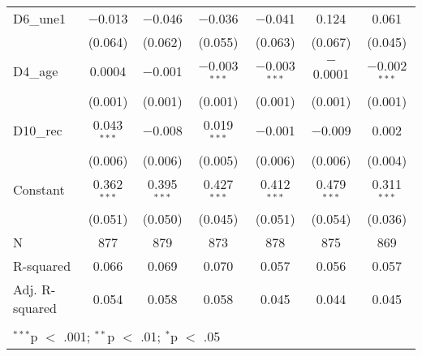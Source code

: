 \documentclass[
]{article}
\begin{document}
\begin{table}[!htbp]
\begin{tabular}{@{\extracolsep{5pt}}lcccccc}
  D6\_une1 & $-$0.013 & $-$0.046 & $-$0.036 & $-$0.041 & 0.124 & 0.061 \\ 
  & (0.064) & (0.062) & (0.055) & (0.063) & (0.067) & (0.045) \\ 
  D4\_age & 0.0004 & $-$0.001 & $-$0.003$^{***}$ & $-$0.003$^{***}$ & $-$0.0001 & $-$0.002$^{***}$ \\ 
  & (0.001) & (0.001) & (0.001) & (0.001) & (0.001) & (0.001) \\ 
  D10\_rec & 0.043$^{***}$ & $-$0.008 & 0.019$^{***}$ & $-$0.001 & $-$0.009 & 0.002 \\ 
  & (0.006) & (0.006) & (0.005) & (0.006) & (0.006) & (0.004) \\ 
  Constant & 0.362$^{***}$ & 0.395$^{***}$ & 0.427$^{***}$ & 0.412$^{***}$ & 0.479$^{***}$ & 0.311$^{***}$ \\ 
  & (0.051) & (0.050) & (0.045) & (0.051) & (0.054) & (0.036) \\ 
 N & 877 & 879 & 873 & 878 & 875 & 869 \\ 
R-squared & 0.066 & 0.069 & 0.070 & 0.057 & 0.056 & 0.057 \\ 
Adj. R-squared & 0.054 & 0.058 & 0.058 & 0.045 & 0.044 & 0.045 \\ 
\hline \\[-1.8ex] 
\multicolumn{7}{l}{$^{***}$p $<$ .001; $^{**}$p $<$ .01; $^{*}$p $<$ .05} \\ 
\end{tabular} 
\end{table}
\end{document}
